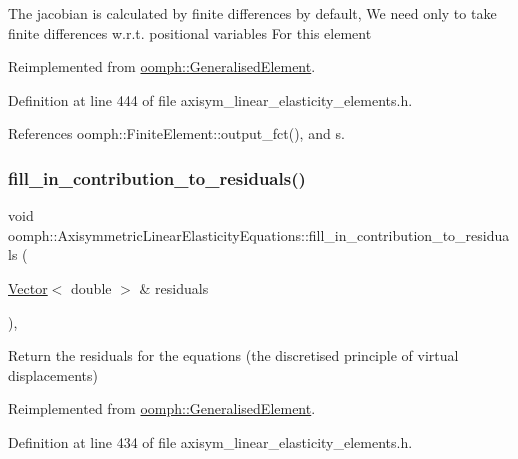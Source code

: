 The jacobian is calculated by finite differences by default, We need only to take finite differences w.\+r.\+t. positional variables For this element 

Reimplemented from \hyperlink{classoomph_1_1GeneralisedElement_a6ae09fc0d68e4309ac1b03583d252845}{oomph\+::\+Generalised\+Element}.



Definition at line 444 of file axisym\+\_\+linear\+\_\+elasticity\+\_\+elements.\+h.



References oomph\+::\+Finite\+Element\+::output\+\_\+fct(), and s.

\mbox{\label{classoomph_1_1AxisymmetricLinearElasticityEquations_adadd2893e700f16f0866b558a687aadb}} 
\subsubsection{\texorpdfstring{fill\+\_\+in\+\_\+contribution\+\_\+to\+\_\+residuals()}{fill\_in\_contribution\_to\_residuals()}}
{\footnotesize\ttfamily void oomph\+::\+Axisymmetric\+Linear\+Elasticity\+Equations\+::fill\+\_\+in\+\_\+contribution\+\_\+to\+\_\+residuals (\begin{DoxyParamCaption}\item[{\hyperlink{classoomph_1_1Vector}{Vector}$<$ double $>$ \&}]{residuals }\end{DoxyParamCaption})\hspace{0.3cm}{\ttfamily [inline]}, {\ttfamily [virtual]}}



Return the residuals for the equations (the discretised principle of virtual displacements) 



Reimplemented from \hyperlink{classoomph_1_1GeneralisedElement_a310c97f515e8504a48179c0e72c550d7}{oomph\+::\+Generalised\+Element}.



Definition at line 434 of file axisym\+\_\+linear\+\_\+elasticity\+\_\+elements.\+h.



